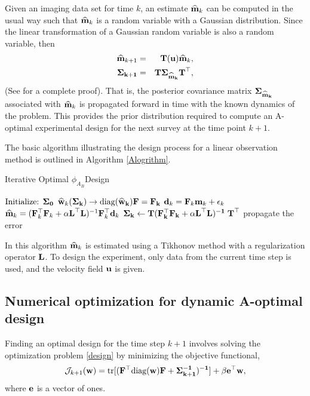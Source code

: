 \documentclass[12pt]{article}
\newcommand {\bfd}   { {\bf d} }
\newcommand {\bfe}   { {\bf e} }
\newcommand {\bfw}   { {\bf w} }
\newcommand {\bfu}   { {\bf u} }
\newcommand {\bfm}   { {\bf m} }
\newcommand {\bfF}  { {\bf F} }
\newcommand{\bT}  {\text{\bf T}} %
\newcommand{\bfL}  {\text{{\bf L}}} %
\newcommand{\JJ}  {\mathcal{J}}    %
\newcommand{\mhat}{\widehat{\bf m}}
\newcommand{\what}{\widehat{\bf w}}
\newcommand{\Sigh}{\bf \Sigma}
\begin{document}
Given an imaging data set for time $k$, an estimate $\mhat_k$ can be computed in the usual way such that $\mhat_k$ is a random  variable with  a Gaussian distribution. 
Since the linear transformation of a Gaussian random variable is also a random variable, then  
\begin{eqnarray*}
\mhat _{k+1} &=& \bT(\bfu)\mhat_k,\\
 \Sigh_{k+1} &=& \bT \Sigh_{\mhat_k} {\bT}^{\top},
\end{eqnarray*}  
 (See \cite{Maybeck1979} for a complete proof).
That is, the posterior covariance matrix $\Sigh_{\mhat_k}$ associated with  $\mhat_k$ is propagated forward in time with the known dynamics of the problem. This provides the prior distribution required to compute an A-optimal experimental design for the next survey at the time point $k+1$.

The basic algorithm illustrating the design process for a linear observation method is outlined in Algorithm \ref{Alogrithm}. 
\begin{algorithm}
\caption{Iterative Optimal $\phi_{A_{B}}$Design}\label{Alogrithm}
\begin{algorithmic}[1]
%
\State $\text{Initialize: }\Sigh_0$
%
%
\State $\what_k(\Sigh_k) \to \text{diag}(\what_k)\bfF = \bfF_k $ 
%
\State $\bfd_k = \bfF_k \bfm_k + \epsilon_k$
%
\State $\mhat_k = (\bfF_k^{\top}\bfF_k +\alpha \bfL^{\top} \bfL)^{-1}\bfF_k^{\top} \bfd_k  $
%
\State $\Sigh_{k} \gets {\bT}(\bfF_k^{\top} \bfF_k +\alpha \bfL^{\top} \bfL)^{-1}\;{\bT}^{\top}$ 
\Comment propagate the error
%
\EndFor\label{euclidendwhile}
\end{algorithmic}
\end{algorithm}
In this algorithm  $\mhat_k$ is estimated using a Tikhonov method with a regularization operator $\bfL$. To design the experiment, only data from the current time step is used, and the velocity field $\bfu$ is given.

\subsection{Numerical optimization for dynamic A-optimal design}
Finding an optimal design for the time step $k+1$ involves solving the optimization problem \ref{design} by minimizing the objective functional,
\begin{equation}
\label{traceObj}
\JJ_{k+1}(\bfw) = \text{tr}[(\bfF^{\top} \text{diag}(\bfw) \bfF + \Sigh_{k+1}^{-1})^{-1}] + \beta \bfe^{\top}\bfw,
\end{equation}
where $\bfe$ is a vector of ones.
\end{document}
